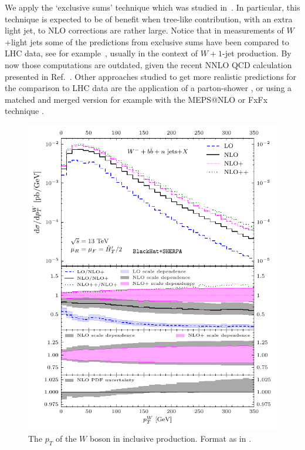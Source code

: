 We apply the `exclusive sums' technique which was studied
in~\cite{ESums}. In particular, this technique is expected to be of benefit when
tree-like contribution, with an extra light jet, to NLO corrections are rather
large. Notice that in measurements of $W$+light jets some of the predictions
from exclusive sums have been compared to LHC data, see for
example~\cite{Aad:2014qxa,ATLAS:ratio2017}, usually in the context of
$W+1$-jet production. By now those computations are outdated, given the recent NNLO QCD calculation
presented in Ref.~\cite{Boughezal:2015dva}. Other approaches studied to get more realistic predictions for the comparison to LHC data are the
application of a parton-shower \cite{Luisoni:2015mpa}, or using a
matched and merged version for example with the MEPS@NLO \cite{Hoeche:2012yf} or FxFx technique \cite{Frederix:2012ps}.

\begin{figure}[t]
\centering
\includegraphics[clip,scale=1]{plots/excl_ptw_v4}
  \caption{The $p_T$ of the $W$ boson in inclusive \Wbbm{} production. Format as in .}
  \label{fig_Wmnjptw}
\end{figure}

